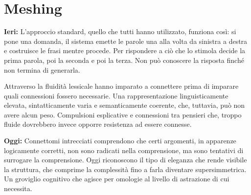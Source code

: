 \chapter{Meshing}

\textbf{Ieri:} L’approccio standard, quello che tutti hanno utilizzato, funziona così: si pone una domanda, il sistema emette le parole una alla volta da sinistra a destra e costruisce le frasi mentre procede. Per rispondere a ciò che lo stimola decide la prima parola, poi la seconda e poi la terza. Non può conoscere la risposta finché non termina di generarla.

Attraverso la fluidità lessicale hanno imparato a connettere prima di imparare quali connessioni fossero necessarie. Una rappresentazione linguisticamente elevata, sintatticamente varia e semanticamente coerente, che, tuttavia, può non avere alcun peso. Compulsioni esplicative e connessioni tra pensieri che, troppo fluide dovrebbero invece opporre resistenza ad essere connesse.

\textbf{Oggi:} Connettomi intrecciati comprendono che certi argomenti, in apparenze logicamente corretti, non sono radicati nella comprensione, ma sono tentativi di surrogare la comprensione. Oggi riconoscono il tipo di eleganza che rende visibile la struttura, che comprime la complessità fino a farla diventare supersimmetrica. Un groviglio cognitivo che agisce per omologie al livello di astrazione di cui necessita.

